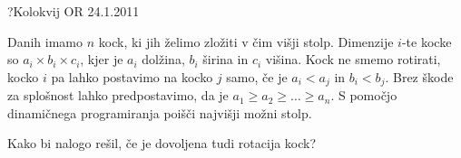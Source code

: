 \begin{naloga}{?}{Kolokvij OR 24.1.2011}
\begin{vprasanje}
Danih imamo $n$ kock, ki jih želimo zložiti v čim višji stolp.
Dimenzije $i$-te kocke so $a_i \times b_i \times c_i$,
kjer je $a_i$ dolžina, $b_i$ širina in $c_i$ višina.
Kock ne smemo rotirati,
kocko $i$ pa lahko postavimo na kocko $j$ samo,
če je $a_i < a_j$ in $b_i < b_j$.
Brez škode za splošnost lahko predpostavimo,
da je $a_1 \ge a_2 \ge \dots \ge a_n$.
S pomočjo dinamičnega programiranja poišči najvišji možni stolp.

Kako bi nalogo rešil, če je dovoljena tudi rotacija kock?
\end{vprasanje}
\begin{odgovor}
\end{odgovor}
\end{naloga}
